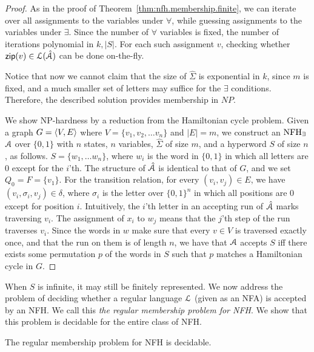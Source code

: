 \begin{proof}
As in the proof of Theorem~\ref{thm:nfh.membership.finite}, we can iterate over all assignments to the variables under $\forall$, while guessing assignments to the variables under $\exists$. Since the number of $\forall$ variables is fixed, the number of iterations polynomial in $k,|S|$. For each such assignment $v$, checking whether $\mathsf{zip}(v)\in\mathcal{L}(\hat{\mathcal{A}})$ can be done on-the-fly. 

Notice that now we cannot claim that the size of $\hat\Sigma$ is exponential in $k$, since $m$ is fixed, and a much smaller set of letters may suffice for the $\exists$ conditions. Therefore, the described solution provides membership in $NP$. 

We show NP-hardness by a reduction from the Hamiltonian cycle problem. Given a graph $G = \langle V,E \rangle$ where $V = \{v_1,v_2,\ldots v_n\}$ and $|E|=m$, we construct an $\textrm{NFH}_{\exists}$ $\mathcal{A}$ over $\{0,1\}$ with $n$ states, $n$ variables, $\hat\Sigma$ of size $m$, and a hyperword $S$ of size $n$, as follows. $S = \{w_1,\ldots w_n\}$, where $w_i$ is the word in $\{0,1\}$ in which all letters are $0$ except for the $i$'th. 
The structure of $\hat{\mathcal{A}}$ is identical to that of $G$, and we set $Q_0 = F = \{v_1\}$. For the transition relation, for every $(v_i,v_j)\in E$, we have $(v_i, \sigma_i,v_j)\in \delta$, where $\sigma_i$ is the letter over $\{0,1\}^n$ in which all positions are $0$ except for position $i$. 
Intuitively, the $i$'th letter in an accepting run of $\hat{\mathcal{A}}$ marks traversing $v_i$. The assignment of $x_i$ to $w_j$ means that the $j$'th step of the run traverses $v_i$. Since the words in $w$ make sure that every $v\in V$ is traversed exactly once, and that the run on them is of length $n$, we have that $\mathcal{A}$ accepts $S$ iff there exists some permutation $p$ of the words in $S$ such that $p$ matches a Hamiltonian cycle in $G$.
\end{proof}

When $S$ is infinite, it may still be finitely represented. 
We now address the problem of deciding whether a regular language $\cal L$ 
(given as an NFA) is accepted by an NFH. We call this {\em the regular 
membership problem for NFH}. We show that this problem is decidable for the 
entire class of NFH. 

\begin{theorem}
The regular membership problem for NFH is decidable.
\end{theorem}

